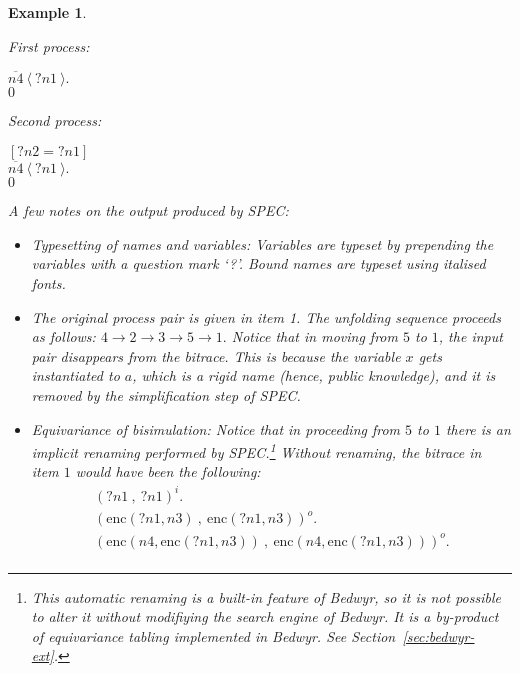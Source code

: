 \documentclass{article}
\newenvironment{example}{\begin{exa} \rm}{\end{exa}}
\newtheorem{exa}[theorem]{Example}
\begin{document}
\begin{example}
\begin{enumerate}
First process: 
\begin{tabbing}$\overline{n4}~\langle ~?n1 ~ \rangle.$ \\ 
$0$ \\ 
\end{tabbing}
Second process: 
\begin{tabbing}${[?n2 = ?n1 ]}$ \\ 
$\overline{n4}~\langle ~?n1 ~ \rangle.$ \\ 
$0$ \\ 
\end{tabbing}
\end{enumerate}
A few notes on the output produced by SPEC:
\begin{itemize}
\item {\em Typesetting of names and variables}: 
Variables are typeset by prepending the variables with a question mark `?'. 
Bound names are typeset using italised fonts. 

\item The original process pair is given in item 1. The unfolding sequence
proceeds as follows: $4 \to 2 \to 3 \to 5 \to 1.$ 
Notice that in moving from $5$ to $1$, the input pair disappears from the bitrace.
This is because the variable $x$ gets instantiated to $a$, which is a rigid name (hence,
public knowledge), and it is removed by the simplification step of SPEC. 

\item {\em Equivariance of bisimulation}: Notice that in proceeding from $5$ to $1$
there is an implicit renaming performed by SPEC.\footnote{This automatic renaming is
a built-in feature of Bedwyr, so it is not possible to alter it without modifiying
the search engine of Bedwyr. It is a by-product of {\em equivariance tabling} implemented
in Bedwyr. See Section~\ref{sec:bedwyr-ext}.} 
Without renaming, the bitrace in item $1$ would have been the following: 
$$
\begin{array}{l}
(?n1~ , ~ ?n1)^i. \\ 
(\mbox{enc}(?n1,n3)~ , ~ \mbox{enc}(?n1,n3))^o. \\ 
(\mbox{enc}(n4,\mbox{enc}(?n1,n3))~ , ~ \mbox{enc}(n4,\mbox{enc}(?n1,n3)))^o. \\ 
\end{array}
$$

\end{itemize}

\end{example}
\end{document}
